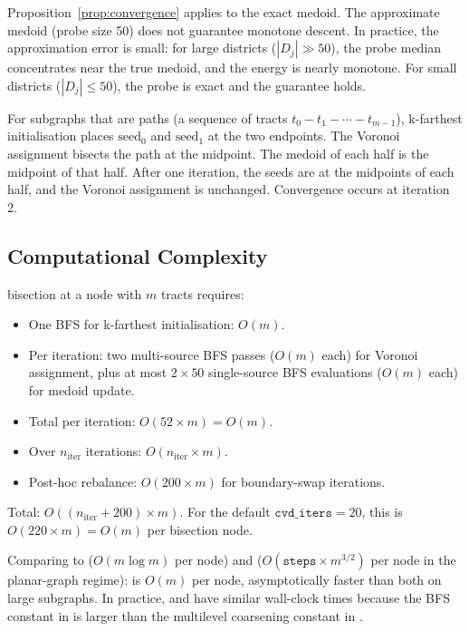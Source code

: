 \begin{remark}
Proposition~\ref{prop:convergence} applies to the exact medoid.
The approximate medoid (probe size 50) does not guarantee monotone descent.
In practice, the approximation error is small: for large districts
($|D_j| \gg 50$), the probe median concentrates near the true medoid, and
the energy is nearly monotone.
For small districts ($|D_j| \le 50$), the probe is exact and the guarantee holds.
\end{remark}

\begin{remark}
For subgraphs that are paths (a sequence of tracts $t_0 - t_1 - \cdots - t_{m-1}$),
k-farthest initialisation places $\mathrm{seed}_0$ and $\mathrm{seed}_1$
at the two endpoints.
The Voronoi assignment bisects the path at the midpoint.
The medoid of each half is the midpoint of that half.
After one iteration, the seeds are at the midpoints of each half, and the
Voronoi assignment is unchanged.
Convergence occurs at iteration 2.
\end{remark}

\subsection{Computational Complexity}

\begin{proposition}
\label{prop:runtime}
\cvd{} bisection at a node with $m$ tracts requires:
\begin{itemize}
\item One BFS for k-farthest initialisation: $O(m)$.
\item Per iteration: two multi-source BFS passes ($O(m)$ each) for
  Voronoi assignment, plus at most $2 \times 50$ single-source BFS
  evaluations ($O(m)$ each) for medoid update.
\item Total per iteration: $O(52 \times m) = O(m)$.
\item Over $n_{\mathrm{iter}}$ iterations: $O(n_{\mathrm{iter}} \times m)$.
\item Post-hoc rebalance: $O(200 \times m)$ for boundary-swap iterations.
\end{itemize}
Total: $O((n_{\mathrm{iter}} + 200) \times m)$.
For the default $\mathtt{cvd\_iters} = 20$, this is $O(220 \times m) = O(m)$
per bisection node.
\end{proposition}

Comparing to \metis{} ($O(m \log m)$ per node) and \sa{} ($O(\mathtt{steps} \times m^{3/2})$
per node in the planar-graph regime): \cvd{} is $O(m)$ per node,
asymptotically faster than both on large subgraphs.
In practice, \cvd{} and \metis{} have similar wall-clock times because the
BFS constant in \cvd{} is larger than the multilevel coarsening constant
in \metis{}.

